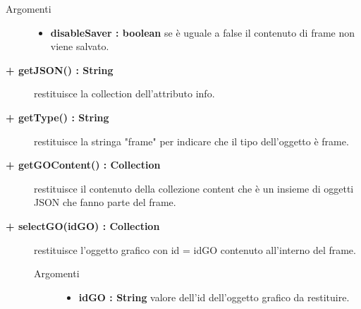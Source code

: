 \begin{description}
\begin{description}
\begin{description}
			\item[Argomenti] \hfill
				\begin{itemize}
						\item \textbf{disableSaver : boolean			} \hfill
					se è uguale a false il contenuto di frame non viene salvato. %
				\end{itemize}

\end{description}

\begin{description}
		\item[\textbf{\color{blue}+ getJSON() : String			}] \hfill
			restituisce la collection dell'attributo info.

\end{description}

\begin{description}
		\item[\textbf{\color{blue}+ getType() : String			}] \hfill
			restituisce la stringa "frame" per indicare che il tipo dell'oggetto è frame.
\end{description}

\begin{description}
		\item[\textbf{\color{blue}+ getGOContent() : Collection			}] \hfill
			restituisce il contenuto della collezione content che è un insieme di oggetti JSON che fanno parte del frame.
\end{description}

\begin{description}
		\item[\textbf{\color{blue}+ selectGO(idGO) : Collection			}] \hfill
			restituisce l'oggetto grafico con id = idGO contenuto all'interno del frame. 

\begin{description}
			\item[Argomenti] \hfill
				\begin{itemize}
						\item \textbf{idGO : String			} \hfill
					valore dell'id dell'oggetto grafico da restituire.  				
				\end{itemize}

\end{description}

\end{description}


\end{description}
\end{description}
